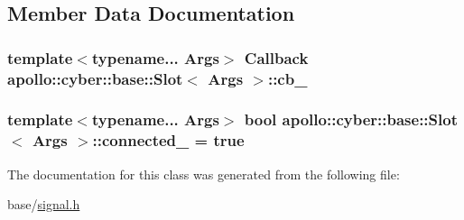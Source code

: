 \subsection{Member Data Documentation}
\hypertarget{classapollo_1_1cyber_1_1base_1_1Slot_aceb00aa55afab2d18b26b268aa182adc}{
\subsubsection[{cb\-\_\-}]{\setlength{\rightskip}{0pt plus 5cm}template$<$typename... Args$>$ {\bf Callback} {\bf apollo\-::cyber\-::base\-::\-Slot}$<$ Args $>$\-::cb\-\_\-\hspace{0.3cm}{\ttfamily [private]}}}\label{classapollo_1_1cyber_1_1base_1_1Slot_aceb00aa55afab2d18b26b268aa182adc}
\hypertarget{classapollo_1_1cyber_1_1base_1_1Slot_a19055072df9557cd3085838873a4999b}{
\subsubsection[{connected\-\_\-}]{\setlength{\rightskip}{0pt plus 5cm}template$<$typename... Args$>$ bool {\bf apollo\-::cyber\-::base\-::\-Slot}$<$ Args $>$\-::connected\-\_\- = true\hspace{0.3cm}{\ttfamily [private]}}}\label{classapollo_1_1cyber_1_1base_1_1Slot_a19055072df9557cd3085838873a4999b}


The documentation for this class was generated from the following file\-:\begin{DoxyCompactItemize}
\item 
base/\hyperlink{signal_8h}{signal.\-h}\end{DoxyCompactItemize}
